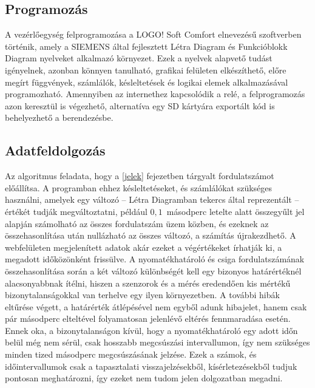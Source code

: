 \subsection{Programozás}

A vezérlőegység felprogramozása a LOGO! Soft Comfort elnevezésű szoftverben történik, amely a SIEMENS által fejlesztett Létra Diagram és Funkcióblokk Diagram nyelveket alkalmazó környezet. Ezek a nyelvek alapvető tudást igényelnek, azonban könnyen tanulható, grafikai felületen elkészíthető, előre megírt függvények, számlálók, késleltetések és logikai elemek alkalmazásával programozható. Amennyiben az internethez kapcsolódik a relé, a felprogramozás azon keresztül is végezhető, alternatíva egy SD kártyára exportált kód is behelyezhető a berendezésbe. 

\subsection{Adatfeldolgozás}
Az algoritmus feladata, hogy a \ref{jelek} fejezetben tárgyalt fordulatszámot előállítsa. A programban ehhez késleltetéseket, és számlálókat szükséges használni, amelyek egy változó -- Létra Diagramban tekercs által reprezentált -- értékét tudják megváltoztatni, például $0,1$~másodperc letelte alatt összegyűlt jel alapján számolható az összes fordulatszám üzem közben, és ezeknek az összehasonlítása után nullázható az összes változó, a számítás újrakezdhető. A webfelületen megjelenített adatok akár ezeket a végértékeket írhatják ki, a megadott időközönként frissülve. A nyomatékhatároló és csiga fordulatszámának összehasonlítása során a két változó különbségét kell egy bizonyos határértéknél alacsonyabbnak ítélni, hiszen a szenzorok és a mérés eredendően kis mértékű bizonytalanságokkal van terhelve egy ilyen környezetben. A további hibák eltűrése végett, a határérték átlépésével nem egyből adunk hibajelet, hanem csak pár másodperc elteltével folyamatosan jelenlévő eltérés fennmaradása esetén. Ennek oka, a bizonytalanságon kívül, hogy a nyomatékhatároló egy adott időn belül még nem sérül, csak hosszabb megcsúszási intervallumon, így nem szükséges minden tized másodperc megcsúszásának jelzése. Ezek a számok, és időintervallumok csak a tapasztalati visszajelzésekből, kísérletezésekből tudjuk pontosan meghatározni, így ezeket nem tudom jelen dolgozatban megadni.

